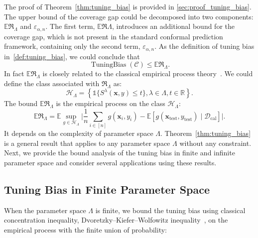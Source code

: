 \documentclass{article}
\newcommand{\E}{\mathbb{E}}
\newcommand{\1}{\mathbbm{1}}
\newcommand{\id}[1]{\mathds{1}\{#1\}}
\newcommand{\TuningBias}{\mathop{\text{TuningBias}}}
\theoremstyle{plain}
\theoremstyle{definition}
\theoremstyle{remark}
\newtheorem{remark}[theorem]{Remark}
\begin{document}
The proof of Theorem~\ref{thm:tuning_bias} is provided in \cref{sec:proof_tuning_bias}.
The upper bound of the coverage gap could be decomposed into two components: $\E\mathfrak{R}_{\Lambda}$ and $\varepsilon_{\alpha, n}$. 
The first term, $\E\mathfrak{R}{\Lambda}$, introduces an additional bound for the coverage gap, which is not present in the standard conformal prediction framework, containing only the second term, $\varepsilon_{\alpha, n}$. 
As the definition of tuning bias in~\cref{def:tuning_bias}, we could conclude that
\begin{equation*}
    \TuningBias({\mathcal{C}}) \leq \E \mathfrak{R}_{\Lambda}.
\end{equation*}
In fact $\E \mathfrak{R}_{\Lambda}$ is closely related to the classical empirical process theory~\citep{vandervaart1996weak, vershynin2018highdimensional}. 
We could define the class associated with $\mathfrak{R}_{\Lambda}$ as:
    \begin{equation*}
        \mathcal{H}_{\Lambda} = \left\{ \id{S^\lambda(\boldsymbol{x},y)\le t}, \lambda\in \Lambda, t\in \mathbb{R} \right\}.
    \end{equation*}
The bound $\E \mathfrak{R}_{\Lambda}$ is the empirical process on the class $\mathcal{H}_{\Lambda}$: 
\begin{equation*}
    \E \mathfrak{R}_{\Lambda} = 
    \E \sup_{g \in \mathcal{H}_{\Lambda}} \Big|
         \frac{1}{n} \sum_{i \in [n]} g(\boldsymbol{x}_i, y_i) - \E[g(\boldsymbol{x}_{\text{test}}, y_{\text{test}}) \mid \mathcal{D}_{\text{cal}}]
    \Big|.
\end{equation*}
It depends on the complexity of parameter space $\Lambda$.
Theorem~\ref{thm:tuning_bias} is a general result that applies to any parameter space $\Lambda$ without any constraint. Next, we provide the bound analysis of the tuning bias in finite and infinite parameter space and consider several applications using these results. 



\subsection{Tuning Bias in Finite Parameter Space}
\label{subsec:finite_parameter_tuning_bias}
When the parameter space $\Lambda$ is finite, we bound the tuning bias using classical concentration inequality, Dvoretzky–Kiefer–Wolfowitz inequality~\citep{dvoretzky1956asymptotic}, on the empirical process with the finite union of probability:
\end{document}
